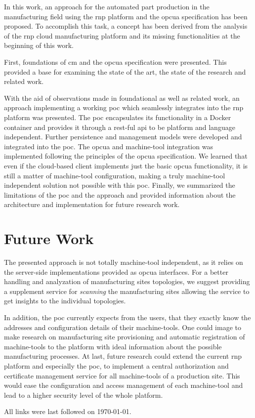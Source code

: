 \documentclass[
a4paper,
twoside,
headsepline,
cleardoublepage=empty,
parskip=half,
draft=false
]{scrbook}
\begin{document}
			In this work, an approach for the automated part production in the manufacturing field using the \gls{rnp} platform and the \gls{opcua} specification has been proposed. To accomplish this task, a concept has been derived from the analysis of the \gls{rnp} cloud manufacturing platform and its missing functionalities at the beginning of this work.

			First, foundations of \gls{cm} and the \gls{opcua} specification were presented. This provided a base for examining the state of the art, the state of the research and related work.

			With the aid of observations made in foundational as well as related work, an approach implementing a working \gls{poc} which seamlessly integrates into the \gls{rnp} platform was presented. The \gls{poc} encapsulates its functionality in a Docker container and provides it through a \gls{rest}-ful \gls{api} to be platform and language independent. Further persistence and management models were developed and integrated into the \gls{poc}. The \gls{opcua} and machine-tool integration was implemented following the principles of the \gls{opcua} specification. We learned that even if the cloud-based client implements just the basic \gls{opcua} functionality, it is still a matter of machine-tool configuration, making a truly machine-tool independent solution not possible with this \gls{poc}. Finally, we summarized the limitations of the \gls{poc} and the approach and provided information about the architecture and implementation for future research work.

		\section{Future Work}\label{sec:future_work}

			The presented approach is not totally machine-tool independent, as it relies on the server-side implementations provided as \gls{opcua} interfaces. For a better handling and analyzation of manufacturing sites topologies, we suggest providing a supplement service for \textit{scanning} the manufacturing sites allowing the service to get insights to the individual topologies.

			In addition, the \gls{poc} currently expects from the users, that they exactly know the addresses and configuration details of their machine-tools. One could image to make research on manufacturing site provisioning and automatic registration of machine-tools to the platform with ideal information about the possible manufacturing processes.
			At last, future research could extend the current \gls{rnp} platform and especially the \gls{poc}, to implement a central authorization and certificate management service for all machine-tools of a production site. This would ease the configuration and access management of each machine-tool and lead to a higher security level of the whole platform.

	\clearpage


	\printbibliography

	All links were last followed on \today.

	\pagestyle{empty}
	\renewcommand*{\chapterpagestyle}{empty}
	\Versicherung
\end{document}

